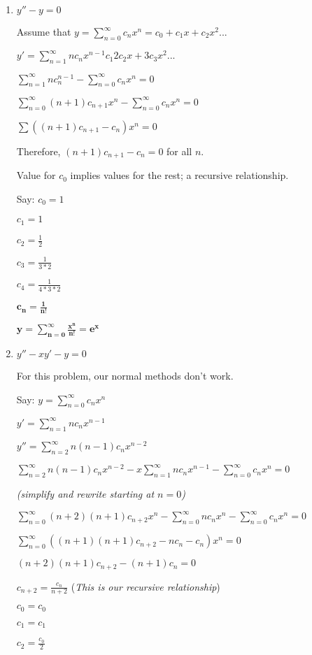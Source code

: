 \documentclass{article}
\begin{document}
\begin{enumerate}
    \item $y''-y=0$

Assume that $y=\sum_{n=0}^{\infty} c_n x^n = c_0 + c_1 x + c_2 x^2...$

$y' = \sum_{n=1}^{\infty} n c_n x^{n-1}c_1 2c_2 x+3c_3 x^2...$

$\sum_{n=1}^{\infty}n c_n^{n-1}-\sum_{n=0}^{\infty} c_n x^n = 0$

$\sum_{n=0}^{\infty}(n+1)c_{n+1}x^{n}-\sum_{n=0}^{\infty} c_n x^n = 0$

$\sum ((n+1)c_{n+1}- c_n)x^n=0$

Therefore, $(n+1)c_{n+1}-c_n = 0$ for all $n$.

Value for $c_0$ implies values for the rest; a recursive relationship.

Say: $c_0 = 1$

$c_1 = 1$

$c_2 = \frac{1}{2}$

$c_3 = \frac{1}{3*2}$

$c_4 = \frac{1}{4*3*2}$

$\mathbf{c_n = \frac{1}{n!}}$

$\mathbf{y = \sum_{n=0}^{\infty} \frac{x^n}{n!} = e^x}$

\item $y''-xy'-y=0$

For this problem, our normal methods don't work.

Say: $y=\sum_{n=0}^{\infty} c_n x^n$

$y' = \sum_{n=1}^{\infty} n c_n x^{n-1}$

$y'' = \sum_{n=2}^{\infty} n(n-1)c_n x^{n-2}$

$\sum_{n=2}^{\infty} n(n-1)c_n x^{n-2} - x\sum_{n=1}^{\infty} n c_n x^{n-1} - \sum_{n=0}^{\infty} c_n x^n = 0$

\textit{(simplify and rewrite starting at $n=0$)}

$\sum_{n=0}^{\infty} (n+2)(n+1)c_{n+2} x^{n} - \sum_{n=0}^{\infty} n c_n x^n - \sum_{n=0}^{\infty} c_n x^n = 0$

$\sum_{n=0}^{\infty} ((n+1)(n+1) c_{n+2} - n c_n - c_n)x^n = 0$

$(n+2)(n+1)c_{n+2}-(n+1)c_n = 0$

$c_{n+2} = \frac{c_n}{n+2}$ (\textit{This is our recursive relationship})

$c_0 = c_0$

$c_1 = c_1$

$c_2 = \frac{c_0}{2}$


\end{enumerate}
\end{document}
